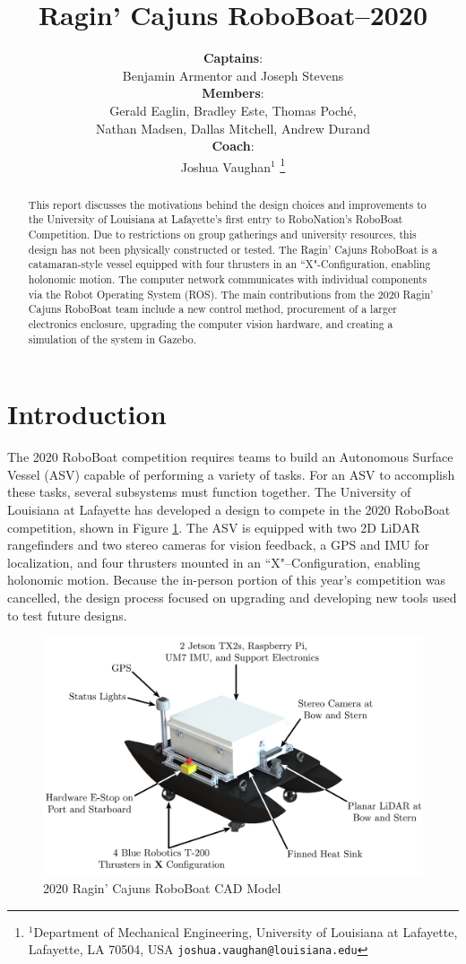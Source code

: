 \documentclass[letterpaper, 12 pt, conference]{ieeeconf}
\title{\LARGE \bf Ragin' Cajuns RoboBoat--2020}
\author{\textbf{Captains}:\\Benjamin Armentor and Joseph Stevens\\
\textbf{Members}:\\Gerald Eaglin, Bradley Este, Thomas Poché, \\Nathan Madsen, Dallas Mitchell, Andrew Durand\\
\textbf{Coach}:\\Joshua Vaughan$^{1}$%
\thanks{$^{1}$Department of Mechanical Engineering,
        University of Louisiana at Lafayette, Lafayette, LA 70504, USA
        {\tt\small joshua.vaughan@louisiana.edu}}%
}
\begin{document}
\maketitle
\thispagestyle{fancyplain}
\begin{abstract}
This report discusses the motivations behind the design choices and improvements to the University of Louisiana at Lafayette's first entry to RoboNation's RoboBoat Competition. Due to restrictions on group gatherings and university resources, this design has not been physically constructed or tested.  The Ragin' Cajuns RoboBoat is a catamaran-style vessel equipped with four thrusters in an ``X"-Configuration, enabling holonomic motion. The computer network communicates with individual components via the Robot Operating System (ROS). The main contributions from the 2020 Ragin' Cajuns RoboBoat team include a new control method, procurement of a larger electronics enclosure, upgrading the computer vision hardware, and creating a simulation of the system in Gazebo.
\end{abstract}

\section{Introduction}
The 2020 RoboBoat competition requires teams to build an Autonomous Surface Vessel (ASV) capable of performing a variety of tasks. For an ASV to accomplish these tasks, several subsystems must function together. The University of Louisiana at Lafayette has developed a design to compete in the 2020 RoboBoat competition, shown in Figure \ref{fig:RoboBoat}. The ASV is equipped with two 2D LiDAR rangefinders and two stereo cameras for vision feedback, a GPS and IMU for localization, and four thrusters mounted in an ``X"--Configuration, enabling holonomic motion. Because the in-person portion of this year's competition was cancelled, the design process focused on upgrading and developing new tools used to test future designs.
%
\begin{figure}[tb]
\centering
\includegraphics[width=\columnwidth]{Figures/Catamaran_Final_Render_3.pdf}
\caption{2020 Ragin' Cajuns RoboBoat CAD Model}
\label{fig:RoboBoat}
\end{figure}
%
\end{document}
